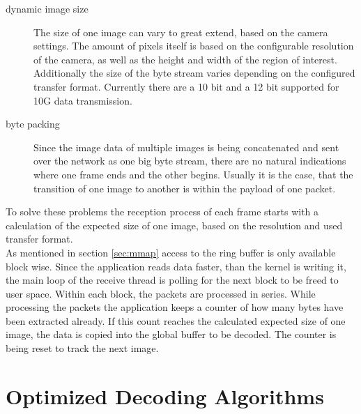 \begin{description}
\item[dynamic image size] The size of one image can vary to great extend, based on the camera settings. The amount of pixels itself is based on the configurable resolution of the camera, as well as the height and width of the region of interest. Additionally the size of the byte stream varies depending on the configured transfer format. Currently there are a 10 bit and a 12 bit supported for 10G data transmission.\\
\item[byte packing] Since the image data of multiple images is being concatenated and sent over the network as one big byte stream, there are no natural indications where one frame ends and the other begins. Usually it is the case, that the transition of one image to another is within the payload of one packet.\\
\end{description}

To solve these problems the reception process of each frame starts with a calculation of the expected size of one image, based on the resolution and used transfer format.\\
As mentioned in section \ref{sec:mmap} access to the ring buffer is only available block wise. Since the application reads data faster, than the kernel is writing it, the main loop of the receive thread is polling for the next block to be freed to user space. Within each block, the packets are processed in series. While processing the packets the application keeps a counter of how many bytes have been extracted already. If this count reaches the calculated expected size of one image, the data is copied into the global buffer to be decoded. The counter is being reset to track the next image.  

\section{Optimized Decoding Algorithms}

